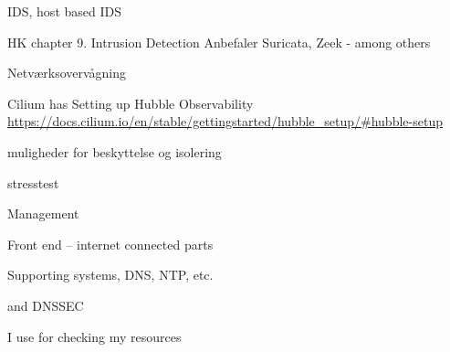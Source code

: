 \documentclass[Screen16to9,17pt]{foils}
\begin{document}

\begin{list2}
\item IDS, host based IDS
\item HK chapter 9. Intrusion Detection
Anbefaler Suricata, Zeek - among others
\end{list2}



\begin{list2}
\item
\end{list2}


\begin{list2}
\item Netværksovervågning
\item Cilium has Setting up Hubble Observability \\
\url{https://docs.cilium.io/en/stable/gettingstarted/hubble_setup/#hubble-setup}
\end{list2}


\begin{list2}
\item muligheder for beskyttelse og isolering
\end{list2}

\begin{list2}
\item stresstest
\end{list2}





\begin{list2}
\item
\end{list2}
Management

Front end -- internet connected parts

Supporting systems, DNS, NTP, etc.


and DNSSEC

I use  for checking my resources



\begin{list2}
\item
\end{list2}
\end{document}
